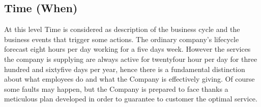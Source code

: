 

\subsection{Time (When)}
\label{subsec:scope[Time]}
At this level Time is considered as description of the business cycle and the business events that trigger some actions. The ordinary company's lifecycle forecast eight hours per day working for a five days week. However the services the company is supplying are always active for twentyfour hour per day for three hundred and sixtyfive days per year, hence there is a fundamental distinction about what employees do and what the Company is effectively giving. Of course some faults may happen, but the Company is prepared to face thanks a meticulous plan developed in order to guarantee to customer the optimal service.


